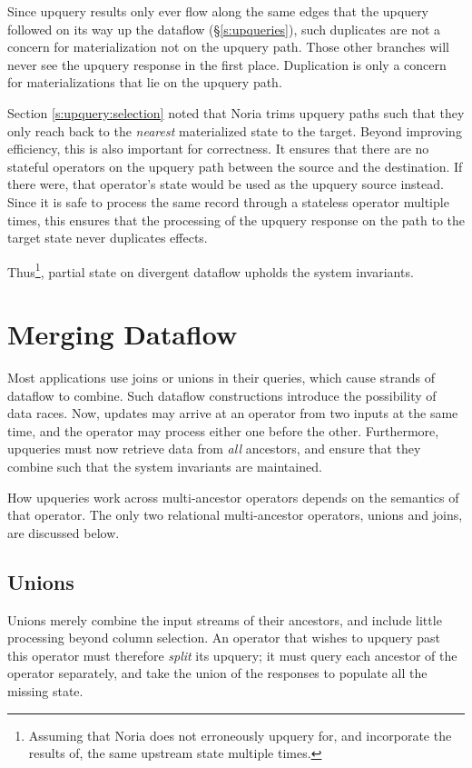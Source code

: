 Since upquery results only ever flow along the same edges that the upquery
followed on its way up the dataflow (\S\ref{s:upqueries}), such duplicates are
not a concern for materialization not on the upquery path. Those other branches
will never see the upquery response in the first place. Duplication is only a
concern for materializations that lie on the upquery path.

Section \ref{s:upquery:selection} noted that Noria trims upquery paths such that
they only reach back to the \emph{nearest} materialized state to the target.
Beyond improving efficiency, this is also important for correctness. It ensures
that there are no stateful operators on the upquery path between the source and
the destination. If there were, that operator's state would be used as the
upquery source instead. Since it is safe to process the same record through a
stateless operator multiple times, this ensures that the processing of the
upquery response on the path to the target state never duplicates effects.

Thus\footnote{Assuming that Noria does not erroneously upquery for, and
incorporate the results of, the same upstream state multiple times.}, partial
state on divergent dataflow upholds the system invariants.

\section{Merging Dataflow}
\label{s:partial:merging}

Most applications use joins or unions in their queries, which cause strands of
dataflow to combine. Such dataflow constructions introduce the possibility of
data races. Now, updates may arrive at an operator from two inputs at the same
time, and the operator may process either one before the other. Furthermore,
upqueries must now retrieve data from \emph{all} ancestors, and ensure that they
combine such that the system invariants are maintained.

How upqueries work across multi-ancestor operators depends on the semantics of
that operator. The only two relational multi-ancestor operators, unions and
joins, are discussed below.

\subsection{Unions}
\label{s:upqueries:union}

Unions merely combine the input streams of their ancestors, and include little
processing beyond column selection. An operator that wishes to upquery past this
operator must therefore \emph{split} its upquery; it must query each ancestor of
the operator separately, and take the union of the responses to populate all the
missing state.

